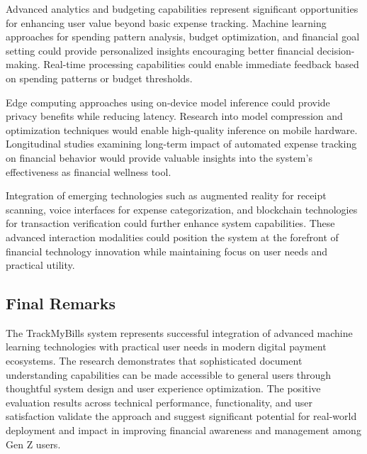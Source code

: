 Advanced analytics and budgeting capabilities represent significant opportunities for enhancing user value beyond basic expense tracking. Machine learning approaches for spending pattern analysis, budget optimization, and financial goal setting could provide personalized insights encouraging better financial decision-making. Real-time processing capabilities could enable immediate feedback based on spending patterns or budget thresholds.

Edge computing approaches using on-device model inference could provide privacy benefits while reducing latency. Research into model compression and optimization techniques would enable high-quality inference on mobile hardware. Longitudinal studies examining long-term impact of automated expense tracking on financial behavior would provide valuable insights into the system's effectiveness as financial wellness tool.

Integration of emerging technologies such as augmented reality for receipt scanning, voice interfaces for expense categorization, and blockchain technologies for transaction verification could further enhance system capabilities. These advanced interaction modalities could position the system at the forefront of financial technology innovation while maintaining focus on user needs and practical utility.

\subsection{Final Remarks}
The TrackMyBills system represents successful integration of advanced machine learning technologies with practical user needs in modern digital payment ecosystems. The research demonstrates that sophisticated document understanding capabilities can be made accessible to general users through thoughtful system design and user experience optimization. The positive evaluation results across technical performance, functionality, and user satisfaction validate the approach and suggest significant potential for real-world deployment and impact in improving financial awareness and management among Gen Z users.